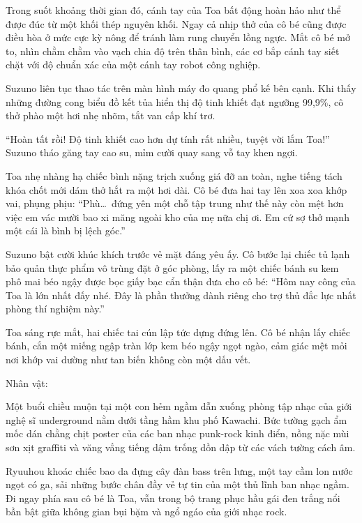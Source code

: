 \documentclass[../main.tex]{subfiles}
\begin{document}
Trong suốt khoảng thời gian đó, cánh tay của Toa bất động hoàn hảo như thể được đúc từ một khối thép nguyên khối. Ngay cả nhịp thở của cô bé cũng được điều hòa ở mức cực kỳ nông để tránh làm rung chuyển lồng ngực. Mắt cô bé mở to, nhìn chằm chằm vào vạch chia độ trên thân bình, các cơ bắp cánh tay siết chặt với độ chuẩn xác của một cánh tay robot công nghiệp.

Suzuno liên tục thao tác trên màn hình máy đo quang phổ kế bên cạnh. Khi thấy những đường cong biểu đồ kết tủa hiển thị độ tinh khiết đạt ngưỡng 99,9\%, cô thở phào một hơi nhẹ nhõm, tắt van cấp khí trơ.

``Hoàn tất rồi! Độ tinh khiết cao hơn dự tính rất nhiều, tuyệt vời lắm Toa!'' Suzuno tháo găng tay cao su, mỉm cười quay sang vỗ tay khen ngợi.

Toa nhẹ nhàng hạ chiếc bình nặng trịch xuống giá đỡ an toàn, nghe tiếng tách khóa chốt mới dám thở hắt ra một hơi dài. Cô bé đưa hai tay lên xoa xoa khớp vai, phụng phịu: ``Phù\dots\ đứng yên một chỗ tập trung như thế này còn mệt hơn việc em vác mười bao xi măng ngoài kho của mẹ nữa chị ơi. Em cứ sợ thở mạnh một cái là bình bị lệch góc.''

Suzuno bật cười khúc khích trước vẻ mặt đáng yêu ấy. Cô bước lại chiếc tủ lạnh bảo quản thực phẩm vô trùng đặt ở góc phòng, lấy ra một chiếc bánh su kem phô mai béo ngậy được bọc giấy bạc cẩn thận đưa cho cô bé: ``Hôm nay công của Toa là lớn nhất đấy nhé. Đây là phần thưởng dành riêng cho trợ thủ đắc lực nhất phòng thí nghiệm này.''

Toa sáng rực mắt, hai chiếc tai cún lập tức dựng đứng lên. Cô bé nhận lấy chiếc bánh, cắn một miếng ngập tràn lớp kem béo ngậy ngọt ngào, cảm giác mệt mỏi nơi khớp vai dường như tan biến không còn một dấu vết.

\newpage

\begin{center}
  {\caviar\fontsize{12pt}{12pt}\selectfont Nhân vật:  }
\end{center}

Một buổi chiều muộn tại một con hẻm ngầm dẫn xuống phòng tập nhạc của giới nghệ sĩ underground nằm dưới tầng hầm khu phố Kawachi. Bức tường gạch ẩm mốc dán chằng chịt poster của các ban nhạc punk-rock kinh điển, nồng nặc mùi sơn xịt graffiti và văng vẳng tiếng dậm trống dồn dập từ các vách tường cách âm.

Ryuuhou khoác chiếc bao da đựng cây đàn bass trên lưng, một tay cầm lon nước ngọt có ga, sải những bước chân đầy vẻ tự tin của một thủ lĩnh ban nhạc ngầm. Đi ngay phía sau cô bé là Toa, vẫn trong bộ trang phục hầu gái đen trắng nổi bần bật giữa không gian bụi bặm và ngổ ngáo của giới nhạc rock.
\end{document}
